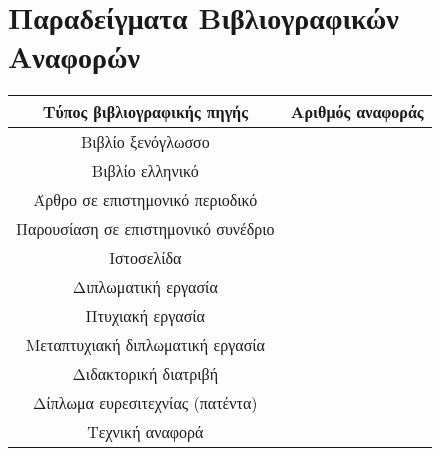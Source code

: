 \chapter{Παραδείγματα Βιβλιογραφικών Αναφορών}

\begin{center}
	\begin{tabular}{|c|c|}
    	\hline
    	\textbf{Τύπος βιβλιογραφικής πηγής} & \textbf{Αριθμός αναφοράς} \\
    	\hline\hline
    	Βιβλίο ξενόγλωσσο &  \cite{goossens93} \\
    	\hline
    	Βιβλίο ελληνικό &  \cite{greekbook} \\
    	\hline
    	Άρθρο σε επιστημονικό περιοδικό &  \cite{LiArTs13} \\
    	\hline
    	Παρουσίαση σε επιστημονικό συνέδριο &  \cite{dcis2011} \\
    	\hline
    	Ιστοσελίδα &  \cite{LaTeXProject} \\
    	\hline
    	Διπλωματική εργασία &  \cite{zoi04} \\
    	\hline
    	Πτυχιακή εργασία &  \cite{elli05} \\
    	\hline
    	Μεταπτυχιακή διπλωματική εργασία &  \cite{master04} \\
    	\hline
    	Διδακτορική διατριβή &  \cite{phd045} \\
    	\hline
    	Δίπλωμα ευρεσιτεχνίας (πατέντα) &  \cite{viswanathan2014convenient} \\
    	\hline
    	Τεχνική αναφορά &  \cite{MSU-CSE-05-29} \\
    	\hline
    \end{tabular}
\end{center}

          

